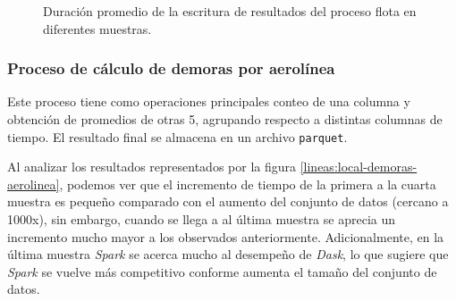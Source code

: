 \begin{figure}
\centering
{}
\caption{Duración promedio de la escritura de resultados del proceso flota en diferentes muestras.}
\label{lineas:local-flota-write}
\end{figure}

\subsubsection{Proceso de cálculo de demoras por aerolínea}

Este proceso tiene como operaciones principales conteo de una columna y obtención de promedios de otras 5, agrupando respecto a distintas columnas de tiempo. El resultado final se almacena en un archivo \texttt{parquet}.

Al analizar los resultados representados por la figura \ref{lineas:local-demoras-aerolinea}, podemos ver que el incremento de tiempo de la primera a la cuarta muestra es pequeño comparado con el aumento del conjunto de datos (cercano a 1000x), sin embargo, cuando se llega a al última muestra se aprecia un incremento mucho mayor a los observados anteriormente. Adicionalmente, en la última muestra \textit{Spark} se acerca mucho al desempeño de \textit{Dask}, lo que sugiere que \textit{Spark} se vuelve más competitivo conforme aumenta el tamaño del conjunto de datos. 

